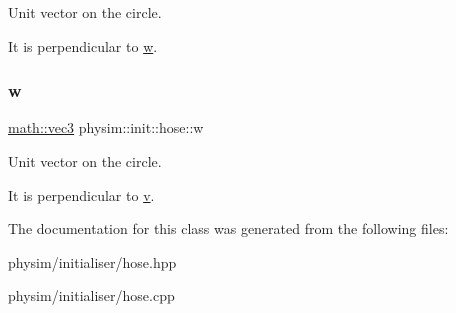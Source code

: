Unit vector on the circle. 

It is perpendicular to \hyperlink{classphysim_1_1init_1_1hose_a0e97ba70e8d36a54fed03ce9472bf4cc}{w}. \mbox{\label{classphysim_1_1init_1_1hose_a0e97ba70e8d36a54fed03ce9472bf4cc}} 
\subsubsection{\texorpdfstring{w}{w}}
{\footnotesize\ttfamily \hyperlink{structphysim_1_1math_1_1vec3}{math\+::vec3} physim\+::init\+::hose\+::w\hspace{0.3cm}{\ttfamily [protected]}}



Unit vector on the circle. 

It is perpendicular to \hyperlink{classphysim_1_1init_1_1hose_a6ab9e1f0fe0f934bd2b8de922e26b294}{v}. 

The documentation for this class was generated from the following files\+:\begin{DoxyCompactItemize}
\item 
physim/initialiser/hose.\+hpp\item 
physim/initialiser/hose.\+cpp\end{DoxyCompactItemize}
